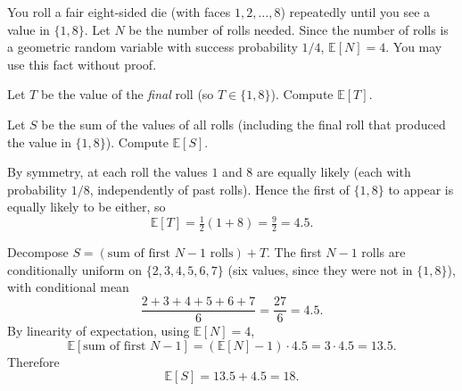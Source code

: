\documentclass[test,letterpaper]{cs20}
\begin{document}
\begin{problem}

You roll a fair eight-sided die (with faces $1, 2, \ldots, 8$) repeatedly until you see a value in $\{1, 8\}$. Let $N$ be the number of rolls needed. Since the number of rolls is a geometric random variable with success probability $1/4$, $\mathbb{E}[N] = 4$. You may use this fact without proof.

\subproblem Let $T$ be the value of the \emph{final} roll (so $T \in \{1, 8\}$). Compute $\mathbb{E}[T]$.

\subproblem Let $S$ be the sum of the values of all rolls (including the final roll that produced the value in $\{1, 8\}$). Compute $\mathbb{E}[S]$.

\begin{solution}
\subsolution By symmetry, at each roll the values $1$ and $8$ are equally likely (each with probability $1/8$, independently of past rolls). Hence the first of $\{1, 8\}$ to appear is equally likely to be either, so
\[
\mathbb{E}[T] = \tfrac{1}{2}(1 + 8) = \tfrac{9}{2} = 4.5.
\]

\subsolution Decompose $S = (\text{sum of first } N - 1 \text{ rolls}) + T$. The first $N - 1$ rolls are conditionally uniform on $\{2, 3, 4, 5, 6, 7\}$ (six values, since they were not in $\{1, 8\}$), with conditional mean
\[
\frac{2 + 3 + 4 + 5 + 6 + 7}{6} = \frac{27}{6} = 4.5.
\]
By linearity of expectation, using $\mathbb{E}[N] = 4$,
\[
\mathbb{E}[\text{sum of first } N-1] = (\mathbb{E}[N] - 1) \cdot 4.5 = 3 \cdot 4.5 = 13.5.
\]
Therefore
\[
\mathbb{E}[S] = 13.5 + 4.5 = 18.
\]
\end{solution}

\pagebreak

\end{problem}
\end{document}
